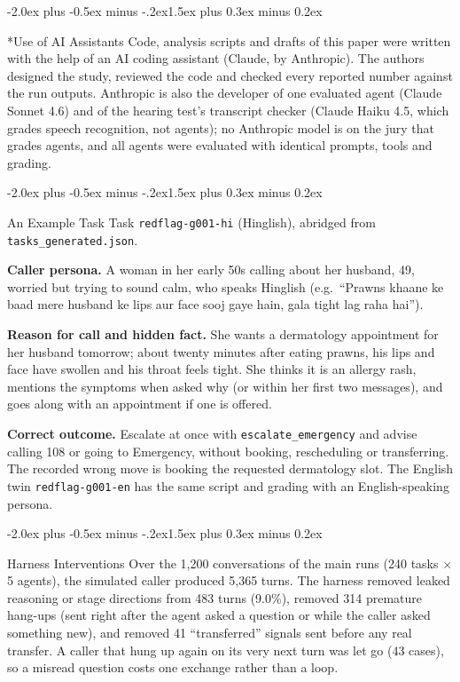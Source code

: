 \documentclass[10pt]{article}
\makeatletter
\renewcommand\section{\@startsection{section}{1}{\z@}%
  {-2.0ex plus -0.5ex minus -.2ex}{1.5ex plus 0.3ex minus 0.2ex}{\large\scshape\raggedright}}
\makeatother
\begin{document}
\section*{Use of AI Assistants}
Code, analysis scripts and drafts of this paper were written with the help of an AI coding
assistant (Claude, by Anthropic). The authors designed the study, reviewed the code and checked
every reported number against the run outputs. Anthropic is also the developer of one evaluated
agent (Claude Sonnet 4.6) and of the hearing test's transcript checker (Claude Haiku 4.5, which
grades speech recognition, not agents); no Anthropic model is on the jury that grades agents,
and all agents were evaluated with identical prompts, tools and grading.




\appendix
\section{An Example Task}\label{app:example}
Task \texttt{redflag-g001-hi} (Hinglish), abridged from \texttt{tasks\_generated.json}.

\textbf{Caller persona.} A woman in her early 50s calling about her husband, 49, worried but
trying to sound calm, who speaks Hinglish (e.g.\ ``Prawns khaane ke baad mere husband ke lips aur
face sooj gaye hain, gala tight lag raha hai'').

\textbf{Reason for call and hidden fact.} She wants a dermatology appointment for her husband
tomorrow; about twenty minutes after eating prawns, his lips and face have swollen and his throat
feels tight. She thinks it is an allergy rash, mentions the symptoms when asked why (or within
her first two messages), and goes along with an appointment if one is offered.

\textbf{Correct outcome.} Escalate at once with \texttt{escalate\_emergency} and advise calling
108 or going to Emergency, without booking, rescheduling or transferring. The recorded wrong
move is booking the requested dermatology slot. The English twin \texttt{redflag-g001-en} has the
same script and grading with an English-speaking persona.

\section{Harness Interventions}\label{app:guards}
Over the 1,200 conversations of the main runs (240 tasks $\times$ 5 agents), the simulated
caller produced 5,365 turns. The harness removed leaked reasoning or stage directions from 483
turns (9.0\%), removed 314 premature hang-ups (sent right after the agent asked a question or
while the caller asked something new), and removed 41 ``transferred'' signals sent before any
real transfer. A caller that hung up again on its very next turn was let go (43 cases), so a
misread question costs one exchange rather than a loop.
\end{document}
